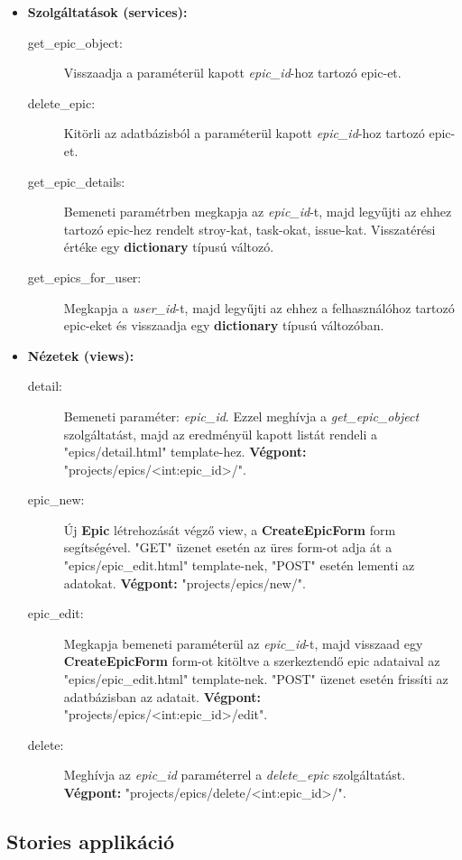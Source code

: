 \begin{itemize}
	\item \textbf{Szolgáltatások (services):}
	\begin{description}
		\item[get\_epic\_object:] Visszaadja a paraméterül kapott \textit{epic\_id}-hoz tartozó epic-et.
		\item[delete\_epic:] Kitörli az adatbázisból a paraméterül kapott \textit{epic\_id}-hoz tartozó epic-et.
		\item[get\_epic\_details:] Bemeneti paramétrben megkapja az  \textit{epic\_id}-t, majd legyűjti az ehhez tartozó epic-hez rendelt stroy-kat, task-okat, issue-kat. Visszatérési értéke egy \textbf{dictionary} típusú változó.
		\item[get\_epics\_for\_user:] Megkapja a \textit{user\_id}-t, majd legyűjti az ehhez a felhasználóhoz tartozó epic-eket és visszaadja egy \textbf{dictionary} típusú változóban.
	\end{description}
	\item \textbf{Nézetek (views):}
	\begin{description}
		\item[detail:] Bemeneti paraméter: \textit{epic\_id}. Ezzel meghívja a \textit{get\_epic\_object} szolgáltatást, majd az eredményül kapott listát rendeli a "epics/detail.html" template-hez. \textbf{Végpont:} "projects/epics/<int:epic\_id>/".
		\item[epic\_new:] Új \textbf{Epic} létrehozását végző view, a \textbf{CreateEpicForm} form segítségével. "GET" üzenet esetén az üres form-ot adja át a "epics/epic\_edit.html" template-nek, "POST" esetén lementi az adatokat. \textbf{Végpont:} "projects/epics/new/".
		\item[epic\_edit:] Megkapja bemeneti paraméterül az \textit{epic\_id}-t, majd visszaad egy \textbf{CreateEpicForm} form-ot kitöltve a szerkeztendő epic adataival az "epics/epic\_edit.html" template-nek. "POST" üzenet esetén frissíti az adatbázisban az adatait. \textbf{Végpont:} "projects/epics/<int:epic\_id>/edit".
		\item[delete:] Meghívja az \textit{epic\_id} paraméterrel a \textit{delete\_epic} szolgáltatást. \textbf{Végpont:} "projects/epics/delete/<int:epic\_id>/".
	\end{description}
\end{itemize}


\subsection{Stories applikáció}

